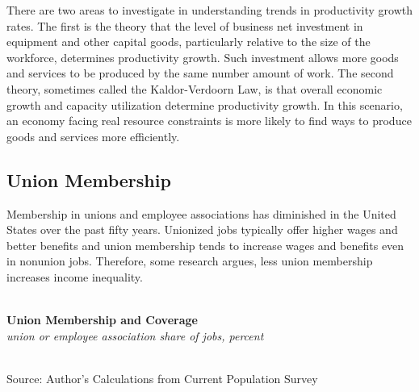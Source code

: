 \documentclass{report}
\makeatletter
\newcommand{\tbllink}[1]{\href{https://raw.githubusercontent.com/bdecon/US-chartbook/master/chartbook/data/#1}{\faTable}}
\newcommand*\short[1]{\expandafter\@gobbletwo\number\numexpr#1\relax}
\newcommand{\sbar}[4]{
		\addplot[ybar stacked, bar width=2.7pt, draw opacity=0, fill=#1] 
			table [x=#2, y=#3, col sep=comma]{#4};}
\newcommand{\dateaxisticks}{
		date coordinates in=x, axis line style={draw=none},
		xmax={2020-02-01},
		max space between ticks=40,	    
		xtick={{1990-01-01}, {1992-01-01}, {1994-01-01}, 
			{1996-01-01}, {1998-01-01}, {2000-01-01}, 
			{2002-01-01}, {2004-01-01}, {2006-01-01},
			{2008-01-01}, {2010-01-01}, {2012-01-01}, {2014-01-01},
		    {2016-01-01}, {2018-01-01}, {2020-01-01}},
		minor xtick={{1989-01-01}, {1991-01-01}, {1993-01-01},
			{1995-01-01}, {1997-01-01}, {1999-01-01}, 
			{2001-01-01}, {2003-01-01}, {2005-01-01}, {2007-01-01},
		    {2009-01-01}, {2011-01-01}, {2013-01-01}, {2015-01-01},
		    {2017-01-01}, {2019-01-01}},
		enlarge y limits={0.06}, enlarge x limits={0.01},
		}
\newcommand{\bbar}[2]{extra #1 ticks = {{#2}}, extra #1 tick labels = ,
		extra #1 tick style = {grid=major, grid style={thick, black!25}},}
\newcommand{\rbars}{
		\fill[color=black!10] (axis cs:{1990-07-01},\pgfkeysvalueof{/pgfplots/ymin}) rectangle 
			(axis cs:{1991-03-01}, \pgfkeysvalueof{/pgfplots/ymax});
		\fill[color=black!10] (axis cs:{2007-12-01},\pgfkeysvalueof{/pgfplots/ymin}) rectangle 
			(axis cs:{2009-07-01}, \pgfkeysvalueof{/pgfplots/ymax});
		\fill[color=black!10] (axis cs:{2001-03-01},\pgfkeysvalueof{/pgfplots/ymin}) rectangle 
			(axis cs:{2001-11-01}, \pgfkeysvalueof{/pgfplots/ymax});}
\makeatother
\begin{document}
{{{{\begin{minipage}{0.76\textwidth}
\small There are two areas to investigate in understanding trends in productivity growth rates. The first is the theory that the level of business net investment in equipment and other capital goods, particularly relative to the size of the workforce, determines productivity growth. Such investment allows more goods and services to be produced by the same number amount of work. The second theory, sometimes called the Kaldor-Verdoorn Law, is that overall economic growth and capacity utilization determine productivity growth. In this scenario, an economy facing real resource constraints is more likely to find ways to produce goods and services more efficiently.\\


\end{minipage}

\newpage

\begin{minipage}{0.76\textwidth}

\subsection*{\color{black!70} \seriffont Union Membership}

\small Membership in unions and employee associations has diminished in the United States over the past fifty years. Unionized jobs typically offer higher wages and better benefits and union membership tends to increase wages and benefits even in nonunion jobs. Therefore, some research argues, less union membership increases income inequality. \\

\\

\vspace{2mm}

\noindent \normalsize \textbf{Union Membership and Coverage}\\
\footnotesize{\textit{union or employee association share of jobs, percent}}\\
\noindent \hspace*{-2mm} \\
\footnotesize{Source: Author's Calculations from Current Population Survey} \hfill \tbllink{union.csv}\\


\end{minipage}}}}}
\end{document}
